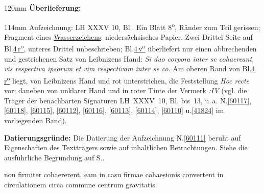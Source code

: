 %
\frenchspacing%
\begin{ledgroupsized}[r]{120mm}%
\footnotesize%
\pstart%
\noindent\textbf{Überlieferung:}%
\pend%
\end{ledgroupsized}%
\begin{ledgroupsized}[r]{114mm}%
\footnotesize%
\pstart%
\parindent -6mm%
%
Aufzeichnung:
LH XXXV 10, Bl..
Ein Blatt 8\textsuperscript{o},
Ränder zum Teil gerissen;
Fragment eines \href{\Scan{LH_35_10_14_004wz}}{Wasserzeichens}:
niedersächsisches Papier. %
Zwei Drittel Seite auf Bl.\;\href{\Scan{LH_35_10_14_004r}}{4\,r\textsuperscript{o}},
unteres Drittel unbeschrieben;
Bl.\;\href{\Scan{LH_35_10_14_004v}}{4\,v\textsuperscript{o}} überliefert nur einen abbrechenden und gestrichenen Satz von Leibnizens Hand:
\textit{Si duo corpora inter se cohaereant, vis respectiva ipsorum et vim respectivam inter se co}.
Am oberen Rand von Bl.\;\href{\Scan{LH_35_10_14_004r}}{4\,r\textsuperscript{o}} liegt, von Leibnizens Hand und rot unterstrichen, die Feststellung \textit{Hoc recte} vor;
daneben von unklarer Hand und in roter Tinte der Vermerk \textit{:\:IV}
(vgl. die Träger der benachbarten Signaturen LH~XXXV~10, Bl. bis~13,
u.\,a. 
N.\;\ref{60117},
\ref{60118},
\ref{60115},
\ref{60112},
\ref{60116},
\ref{60113},
\ref{60114},
\ref{60110}
u.\;\ref{41824}
im vorliegenden Band).
\pend%
\end{ledgroupsized}%
\vspace{5mm}%
\begin{ledgroup}%
\footnotesize%
\pstart%
\noindent%
\textbf{Datierungsgründe:}
Die Datierung der Aufzeichnung N.\;\ref{60111} beruht auf Eigenschaften des Textträgers sowie auf inhaltlichen Betrachtungen.
Siehe die ausführliche Begründung auf S.\;\pageref{60111_dat}.%
\pend%
\end{ledgroup}%
%
\frenchspacing%
\vspace{8mm}%
\normalsize%
\pstart%
\noindent%
non firmiter cohaererent,%
eam in casu firmae cohaesionis convertent%
%
in circulationem circa commune centrum gravitatis.%
